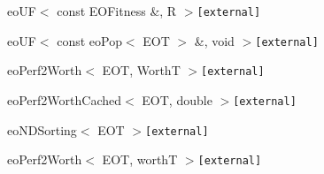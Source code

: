\begin{CompactList}
\begin{CompactList}
\begin{CompactList}
\end{CompactList}
\item eo\-UF$<$ const EOFitness \&, R $>${\tt  [external]}\begin{CompactList}
\item {}
\begin{CompactList}
\item {}
\end{CompactList}
\end{CompactList}
\item eo\-UF$<$ const eo\-Pop$<$ EOT $>$ \&, void $>${\tt  [external]}\begin{CompactList}
\item eo\-Perf2Worth$<$ EOT, Worth\-T $>${\tt  [external]}\begin{CompactList}
\item eo\-Perf2Worth\-Cached$<$ EOT, double $>${\tt  [external]}\begin{CompactList}
\item eo\-NDSorting$<$ EOT $>${\tt  [external]}\begin{CompactList}
\item {}
\end{CompactList}
\item {}
\begin{CompactList}
\item {}
\end{CompactList}
\item {}
\begin{CompactList}
\item {}
\item {}
\end{CompactList}
\end{CompactList}
\end{CompactList}
\item eo\-Perf2Worth$<$ EOT, worth\-T $>${\tt  [external]}\begin{CompactList}

\end{CompactList}
\end{CompactList}
\end{CompactList}
\end{CompactList}
